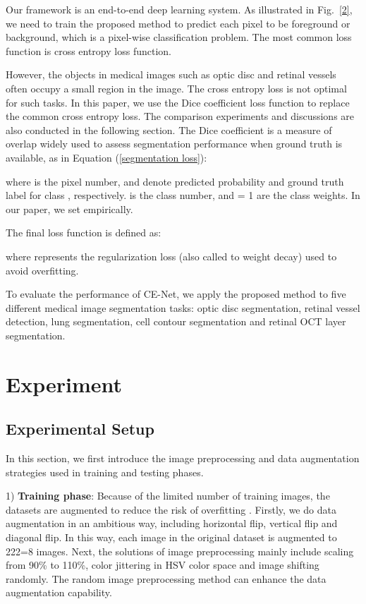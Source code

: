 \documentclass[journal]{IEEEtran}
\begin{document}
Our framework is an end-to-end deep learning system. As illustrated in Fig.~\ref{2}, we need to train the proposed method to predict each pixel to be foreground or background, which is a pixel-wise classification problem. The most common loss function is cross entropy loss function.






However, the objects in medical images such as optic disc and retinal vessels often occupy a small region  in the image. The cross entropy loss is not optimal for such tasks. In this paper, we use the Dice coefficient loss function \cite{crum2006generalized, milletari2016v} to replace the common cross entropy loss. The comparison experiments and discussions are also conducted in the following section.  The Dice coefficient is a measure of overlap widely used to assess segmentation performance when ground truth is available, as in Equation (\ref{segmentation loss}):


where  is the pixel number,    and   
denote predicted probability and ground truth label for class , respectively.  is the class number, and  = 1 are the class weights. In our paper, we set  empirically.

  The final loss function is defined as:

where  represents the regularization loss (also called to weight decay) \cite{hoerl1970ridge} used to avoid overfitting.

To evaluate the performance of CE-Net, we apply the proposed method to five different medical image segmentation tasks: optic disc segmentation, retinal vessel detection, lung segmentation, cell contour segmentation and retinal OCT layer segmentation.

\section{Experiment}
\label{Experiment}
\subsection{Experimental Setup}
In this section, we first introduce the image preprocessing and data augmentation strategies   used in training and testing phases.

1) \textbf{Training phase}: 
Because of the limited number of training images, the datasets are augmented to reduce the risk of overfitting \cite{krizhevsky2012imagenet}. Firstly, we do data augmentation in an ambitious way, including horizontal flip, vertical flip and diagonal flip. In this way, each image in the original dataset is augmented to 222=8 images. Next,
the solutions of image preprocessing mainly include scaling from 90\% to 110\%, color jittering in HSV color space and image shifting randomly. The random image preprocessing method can enhance the data augmentation capability. 
\end{document}

